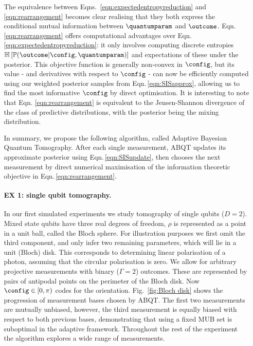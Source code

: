 The equivalence between Eqns.\, \eqref{eqn:expectedentropyreduction} and \eqref{eqn:rearrangement} becomes clear realising that they both express the conditional mutual information between $\quantumparam$ and $\outcome$. Eqn.\,\eqref{eqn:rearrangement} offers computational advantages over Eqn.\,\eqref{eqn:expectedentropyreduction}: it only involves computing discrete entropies $\mathbb{H}\left[ \mathbb{P}(\outcome|\config,\quantumparam) \right]$ and expectations of these under the posterior. This objective function is generally non-convex in $\config$, but its value - and derivatives with respect to $\config$ - can now be efficiently computed using our weighted posterior samples from Eqn.\,\eqref{eqn:SISapprox}, allowing us to find the most informative $\config$ by direct optimisation. It is interesting to note that Eqn. \eqref{eqn:rearrangement} is equivalent to the Jensen-Shannon divergence of the class of predictive distributions, with the posterior being the mixing distribution.

In summary, we propose the following algorithm, called Adaptive Bayesian Quantum Tomography. After each single measurement, ABQT updates its approximate posterior using Eqn.\,\eqref{eqn:SISupdate}, then chooses the next measurement by direct numerical maximisation of the information theoretic objective in Eqn.\,\eqref{eqn:rearrangement}.

\paragraph{EX 1: single qubit tomography.} In our first simulated experiments we study tomography of single qubits ($D=2$). Mixed state qubits have three real degrees of freedom, $\rho$ is represented as a point in a unit ball, called the Bloch sphere. For illustration purposes we first omit the third component, and only infer two remaining parameters, which will lie in a unit (Bloch) disk. This corresponds to \eg determining linear polarisation of a photon, assuming that the circular polarisation is zero. We allow for arbitrary projective measurements with binary ($\Gamma = 2$) outcomes. These are represented by pairs of antipodal points on the perimeter of the Bloch disk. Now $\config\in[0,\pi)$ codes for the orientation. Fig.\ \ref{fig:Bloch disk} shows the progression of measurement bases chosen by ABQT. The first two measurements are mutually unbiased, however, the third measurement is equally biased with respect to both previous bases, demonstrating that using a fixed MUB set is suboptimal in the adaptive framework. Throughout the rest of the experiment the algorithm explores a wide range of measurements.

